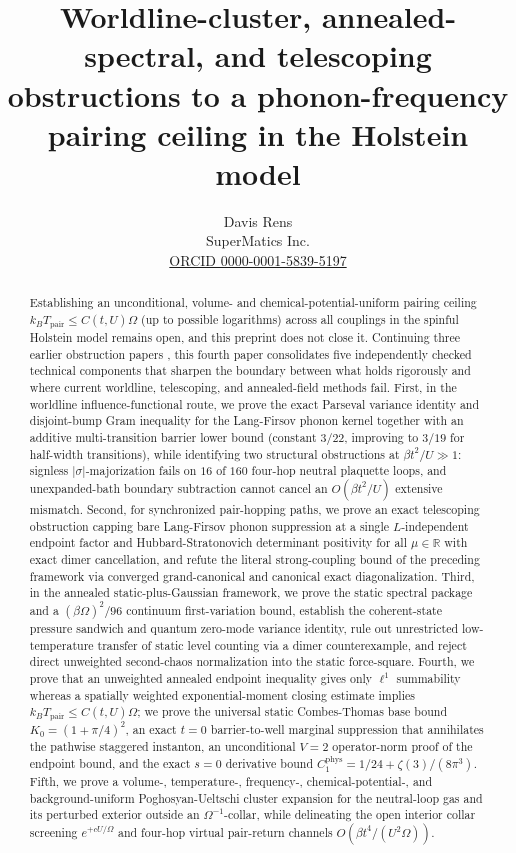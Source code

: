 \documentclass[11pt]{article}
\title{Worldline-cluster, annealed-spectral, and telescoping obstructions to a phonon-frequency pairing ceiling in the Holstein model}
\author{Davis Rens\\SuperMatics Inc.\\\href{https://orcid.org/0000-0001-5839-5197}{ORCID 0000-0001-5839-5197}}
\date{}
\theoremstyle{definition}
\theoremstyle{remark}
\newcommand{\R}{\mathbb{R}}
\newcommand{\Tpair}{T_{\mathrm{pair}}}
\begin{document}
\maketitle

\begin{abstract}
Establishing an unconditional, volume- and chemical-potential-uniform pairing
ceiling $k_B \Tpair \le C(t,U)\Omega$ (up to possible logarithms) across all
couplings in the spinful Holstein model remains open, and this preprint does
not close it. Continuing three earlier obstruction papers
\cite{barriers1,barriers2,barriers3}, this fourth paper consolidates five
independently checked technical components that sharpen the boundary between
what holds rigorously and where current worldline, telescoping, and
annealed-field methods fail. First, in the worldline influence-functional
route, we prove the exact Parseval variance identity and disjoint-bump Gram
inequality for the Lang-Firsov phonon kernel together with an additive
multi-transition barrier lower bound (constant $3/22$, improving to $3/19$ for
half-width transitions), while identifying two structural obstructions at
$\beta t^2/U \gg 1$: signless $|\sigma|$-majorization fails on $16$ of $160$
four-hop neutral plaquette loops, and unexpanded-bath boundary subtraction
cannot cancel an $O(\beta t^2/U)$ extensive mismatch. Second, for synchronized
pair-hopping paths, we prove an exact telescoping obstruction capping bare
Lang-Firsov phonon suppression at a single $L$-independent endpoint factor and
Hubbard-Stratonovich determinant positivity for all $\mu \in \R$ with exact dimer
cancellation, and refute the literal strong-coupling bound of the preceding
framework via converged grand-canonical and canonical exact diagonalization.
Third, in the annealed static-plus-Gaussian framework, we prove the static
spectral package and a $(\beta\Omega)^2/96$ continuum first-variation bound,
establish the coherent-state pressure sandwich and quantum zero-mode variance
identity, rule out unrestricted low-temperature transfer of static level
counting via a dimer counterexample, and reject direct unweighted second-chaos
normalization into the static force-square. Fourth, we prove that an
unweighted annealed endpoint inequality gives only $\ell^1$ summability whereas
a spatially weighted exponential-moment closing estimate implies
$k_B \Tpair \le C(t,U)\Omega$; we prove the universal static Combes-Thomas base
bound $K_0 = (1+\pi/4)^2$, an exact $t=0$ barrier-to-well marginal suppression
that annihilates the pathwise staggered instanton, an unconditional $V=2$
operator-norm proof of the endpoint bound, and the exact $s=0$ derivative
bound $C_1^{\mathrm{phys}} = 1/24 + \zeta(3)/(8\pi^3)$. Fifth, we prove a
volume-, temperature-, frequency-, chemical-potential-, and background-uniform
Poghosyan-Ueltschi cluster expansion for the neutral-loop gas and its
perturbed exterior outside an $\Omega^{-1}$-collar, while delineating the open
interior collar screening $e^{+c U/\Omega}$ and four-hop virtual pair-return
channels $O(\beta t^4/(U^2\Omega))$.
\end{abstract}
\end{document}
